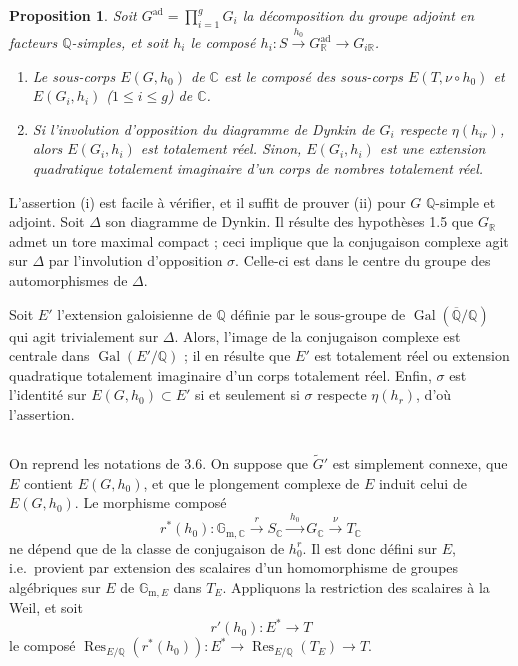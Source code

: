 \documentclass[11pt]{amsart}
\theoremstyle{plain}
\newtheorem{proposition}[theorem]{Proposition}
\theoremstyle{definition}
\DeclareMathOperator{\Gal}{Gal}
\DeclareMathOperator{\Res}{Res}
\DeclareMathOperator{\ad}{ad}
\newcommand{\QQ}{\mathbb{Q}}
\newcommand{\RR}{\mathbb{R}}
\newcommand{\CC}{\mathbb{C}}
\begin{document}
\begin{proposition}
Soit $G^{\ad} = \prod_{i=1}^g G_i$ la d\'ecomposition du groupe adjoint en facteurs $\QQ$-simples, et soit $h_i$ le compos\'e $h_i : S \xrightarrow{h_0} G_{\RR}^{\ad} \to G_{i\RR}$.
\begin{enumerate}
\item[(i)] Le sous-corps $E(G,h_0)$ de $\CC$ est le compos\'e des sous-corps $E(T, \nu \circ h_0)$ et $E(G_i, h_i)$ ($1 \leq i \leq g$) de $\CC$.
\item[(ii)] Si l'involution d'opposition du diagramme de Dynkin de $G_i$ respecte $\eta(h_{ir})$, alors $E(G_i, h_i)$ est totalement r\'eel. Sinon, $E(G_i, h_i)$ est une extension quadratique totalement imaginaire d'un corps de nombres totalement r\'eel.
\end{enumerate}
\end{proposition}

L'assertion (i) est facile \`a v\'erifier, et il suffit de prouver (ii) pour $G$ $\QQ$-simple et adjoint. Soit $\Delta$ son diagramme de Dynkin. Il r\'esulte des hypoth\`eses 1.5 que $G_{\RR}$ admet un tore maximal compact ; ceci implique que la conjugaison complexe agit sur $\Delta$ par l'involution d'opposition $\sigma$. Celle-ci est dans le centre du groupe des automorphismes de $\Delta$.

Soit $E'$ l'extension galoisienne de $\QQ$ d\'efinie par le sous-groupe de $\Gal(\overline{\QQ}/\QQ)$ qui agit trivialement sur $\Delta$. Alors, l'image de la conjugaison complexe est centrale dans $\Gal(E'/\QQ)$ ; il en r\'esulte que $E'$ est totalement r\'eel ou extension quadratique totalement imaginaire d'un corps totalement r\'eel. Enfin, $\sigma$ est l'identit\'e sur $E(G,h_0) \subset E'$ si et seulement si $\sigma$ respecte $\eta(h_r)$, d'o\`u l'assertion.

\subsection{}

On reprend les notations de 3.6. On suppose que $\tilde{G}'$ est simplement connexe, que $E$ contient $E(G,h_0)$, et que le plongement complexe de $E$ induit celui de $E(G,h_0)$. Le morphisme compos\'e
\[
r^*(h_0) : \mathbb{G}_{\mathrm{m},\CC} \xrightarrow{\;r\;} S_{\CC} \xrightarrow{\;h_0\;} G_{\CC} \xrightarrow{\;\nu\;} T_{\CC}
\]
ne d\'epend que de la classe de conjugaison de $h_0^r$. Il est donc d\'efini sur $E$, i.e.\ provient par extension des scalaires d'un homomorphisme de groupes alg\'ebriques sur $E$ de $\mathbb{G}_{\mathrm{m},E}$ dans $T_E$. Appliquons la restriction des scalaires \`a la Weil, et soit
\[
r'(h_0) : E^* \longrightarrow T
\]
le compos\'e $\Res_{E/\QQ}(r^*(h_0)) : E^* \to \Res_{E/\QQ}(T_E) \to T$.
\end{document}
